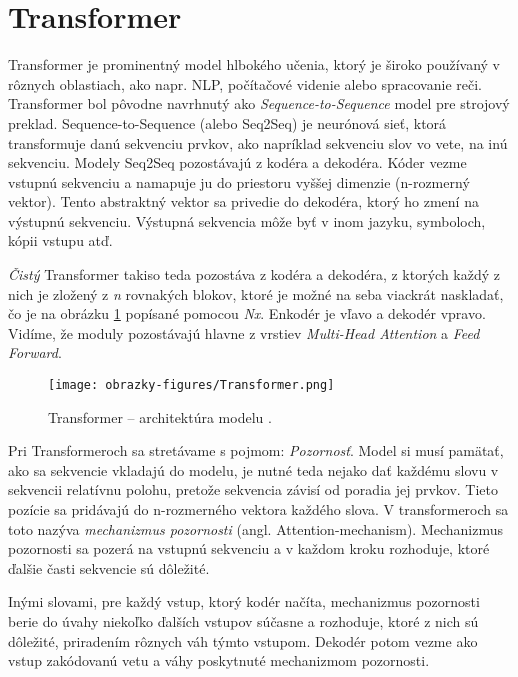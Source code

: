 \section{Transformer}

Transformer \cite{Vaswani:2017} je prominentný model hlbokého učenia, ktorý je široko používaný v rôznych oblastiach, ako napr. NLP, počítačové videnie alebo spracovanie reči.
Transformer bol pôvodne navrhnutý ako \textit{Sequence-to-Sequence} model pre strojový preklad. Sequence-to-Sequence (alebo Seq2Seq) je neurónová sieť, ktorá transformuje danú sekvenciu prvkov, ako napríklad sekvenciu slov vo vete, na inú sekvenciu. Modely Seq2Seq pozostávajú z kodéra a dekodéra. Kóder vezme vstupnú sekvenciu a namapuje ju do priestoru vyššej dimenzie (n-rozmerný vektor). Tento abstraktný vektor sa privedie do dekodéra, ktorý ho zmení na výstupnú sekvenciu. Výstupná sekvencia môže byť v inom jazyku, symboloch, kópii vstupu atď.

\textit{Čistý} Transformer takiso teda pozostáva z kodéra a dekodéra, z ktorých každý z nich je zložený z \textit{n} rovnakých blokov, ktoré je možné na seba viackrát naskladať, čo je na obrázku \ref{transformer} popísané pomocou \textit{Nx}. Enkodér je vľavo a dekodér vpravo. Vidíme, že moduly pozostávajú hlavne z vrstiev \textit{Multi-Head Attention} a \textit{Feed Forward}.

\begin{figure}[ht!]
	\centering
	\texttt{[image: obrazky-figures/Transformer.png]}
	\caption{Transformer -- architektúra modelu \cite{Vaswani:2017}.}
	\label{transformer}
\end{figure}

Pri Transformeroch sa stretávame s pojmom: \textit{Pozornosť}. Model si musí pamätať, ako sa sekvencie vkladajú do modelu, je nutné teda nejako dať každému slovu v sekvencii relatívnu polohu, pretože sekvencia závisí od poradia jej prvkov. Tieto pozície sa pridávajú do n-rozmerného vektora každého slova. V transformeroch sa toto nazýva \textit{mechanizmus pozornosti} (angl. Attention-mechanism). Mechanizmus pozornosti sa pozerá na vstupnú sekvenciu a v každom kroku rozhoduje, ktoré ďalšie časti sekvencie sú dôležité.

Inými slovami, pre každý vstup, ktorý kodér načíta, mechanizmus pozornosti berie do úvahy niekoľko ďalších vstupov súčasne a rozhoduje, ktoré z nich sú dôležité, priradením rôznych váh týmto vstupom. Dekodér potom vezme ako vstup zakódovanú vetu a váhy poskytnuté mechanizmom pozornosti.

